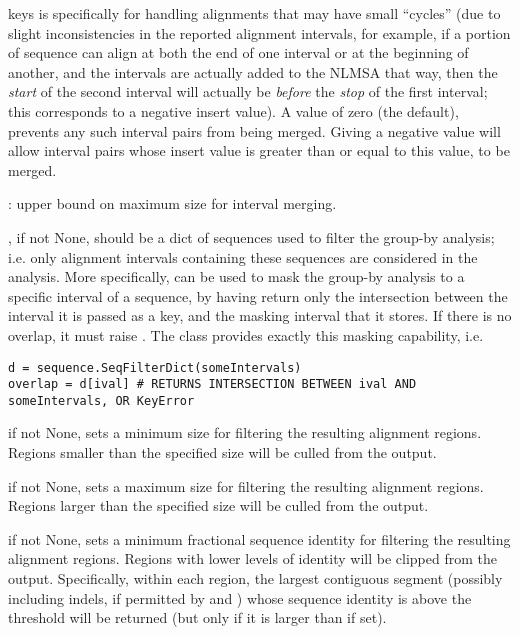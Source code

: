 \documentclass{howto}
\begin{document}
\begin{funcdesc}{keys}
   is specifically for handling
  alignments that may have small ``cycles'' (due to slight inconsistencies
  in the reported alignment intervals, for example, if a portion of sequence
  can align at both the end of one interval or at the beginning of another, and
  the intervals are actually added to the NLMSA that way, then the {\em start}
  of the second interval will actually be {\em before} the {\em stop} of 
  the first interval; this corresponds to a negative insert value).  A
   value of zero (the default), prevents any such interval
  pairs from being merged.  Giving a negative  value will allow
  interval pairs whose insert value is greater than or equal to this value, 
  to be merged.

  : upper bound on maximum size for interval merging.

  , if not None, should be a dict of sequences
  used to filter the group-by analysis; i.e. only alignment intervals 
  containing these sequences are considered in the analysis.  More
  specifically,  can be used to mask the group-by analysis
  to a specific interval of a sequence, by having 
  return only the intersection between the interval it is passed as a key,
  and the masking interval that it stores.  If there is no overlap, it
  must raise .  The  class
  provides exactly this masking capability, i.e.
\begin{verbatim}
d = sequence.SeqFilterDict(someIntervals)
overlap = d[ival] # RETURNS INTERSECTION BETWEEN ival AND someIntervals, OR KeyError
\end{verbatim}
   if not None, sets a minimum size for filtering the resulting
  alignment regions.  Regions smaller than the specified size will be culled
  from the output.  

   if not None, sets a maximum size for filtering the resulting
  alignment regions.  Regions larger than the specified size will be culled
  from the output.  

   if not None, sets a minimum fractional sequence identity
  for filtering the resulting alignment regions.  Regions with lower levels
  of identity will be clipped from the output.  Specifically, within each
  region, the largest contiguous segment (possibly including indels, if
  permitted by  and ) whose sequence identity is above the
  threshold will be returned (but only if it is larger than 
  if set).  


\end{funcdesc}
\end{document}
